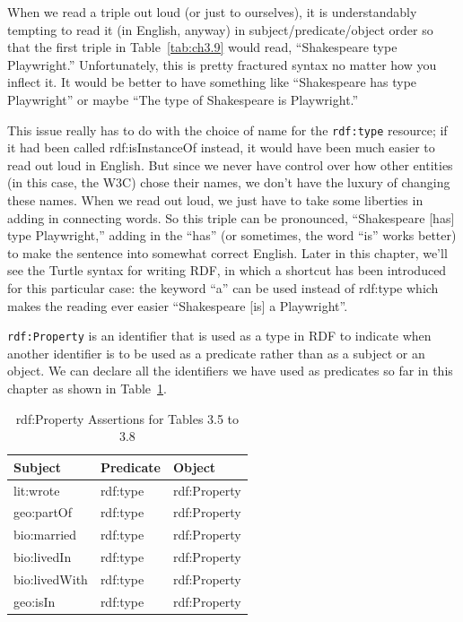 When we read a triple out loud (or just to ourselves), it is
understandably tempting to read it (in English, anyway) in
subject/predicate/object order so that the first triple in Table~\ref{tab:ch3.9}
would read, ``Shakespeare type Playwright.'' Unfortunately, this is
pretty fractured syntax no matter how you inflect it. It would be better
to have something like ``Shakespeare has type Playwright'' or maybe
``The type of Shakespeare is Playwright.''

This issue really has to do with the choice of name for the \texttt{rdf:type}
resource; if it had been called rdf:isInstanceOf instead, it would have
been much easier to read out loud in English. But since we never have
control over how other entities (in this case, the W3C) chose their
names, we don't have the luxury of changing these names. When we read
out loud, we just have to take some liberties in adding in connecting
words. So this triple can be pronounced, ``Shakespeare {[}has{]} type
Playwright,'' adding in the ``has'' (or sometimes, the word ``is'' works
better) to make the sentence into somewhat correct English. Later in
this chapter, we'll see the Turtle syntax for writing RDF, in which a
shortcut has been introduced for this particular case: the keyword ``a''
can be used instead of rdf:type which makes the reading ever easier
``Shakespeare {[}is{]} a Playwright''.

\texttt{rdf:Property} is an identifier that is used as a type in RDF to indicate
when another identifier is to be used as a predicate rather than as a
subject or an object. We can declare all the identifiers we have used as
predicates so far in this chapter as shown in Table~\ref{tab:ch3.11}.

\begin{table}[h]
\centering
\begin{tabular}{||l l l ||} 
 \hline
 Subject&Predicate&Object \\ [0.5ex] 
 \hline\hline
lit:wrote&rdf:type&rdf:Property\\
geo:partOf&rdf:type&rdf:Property\\
bio:married&rdf:type&rdf:Property\\
bio:livedIn&rdf:type&rdf:Property\\
bio:livedWith&rdf:type&rdf:Property\\
geo:isIn&rdf:type&rdf:Property\\
\hline
\end{tabular}
\caption{rdf:Property Assertions for Tables 3.5 to 3.8}
\label{tab:ch3.11}
\end{table}

